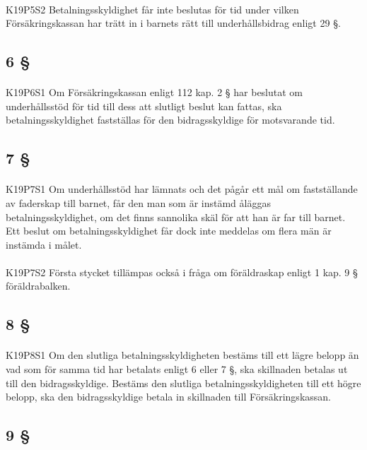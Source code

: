 \documentclass[a4paper,notitlepage,openany,10pt]{book}
\begin{document}
\paragraph*{}
{\tiny K19P5S2}
Betalningsskyldighet får inte beslutas för tid under vilken Försäkringskassan har trätt in i barnets rätt till underhållsbidrag enligt 29 §.
\subsection*{6 §}
\paragraph*{}
{\tiny K19P6S1}
Om Försäkringskassan enligt 112 kap. 2 § har beslutat om underhållsstöd för tid till dess att slutligt beslut kan fattas, ska betalningsskyldighet fastställas för den bidragsskyldige för motsvarande tid.
\subsection*{7 §}
\paragraph*{}
{\tiny K19P7S1}
Om underhållsstöd har lämnats och det pågår ett mål om fastställande av faderskap till barnet, får den man som är instämd åläggas betalningsskyldighet, om det finns sannolika skäl för att han är far till barnet. Ett beslut om betalningsskyldighet får dock inte meddelas om flera män är instämda i målet.
\paragraph*{}
{\tiny K19P7S2}
Första stycket tillämpas också i fråga om föräldraskap enligt 1 kap. 9 § föräldrabalken.
\subsection*{8 §}
\paragraph*{}
{\tiny K19P8S1}
Om den slutliga betalningsskyldigheten bestäms till ett lägre belopp än vad som för samma tid har betalats enligt 6 eller 7 §, ska skillnaden betalas ut till den bidragsskyldige. Bestäms den slutliga betalningsskyldigheten till ett högre belopp, ska den bidragsskyldige betala in skillnaden till Försäkringskassan.
\subsection*{9 §}
\end{document}
